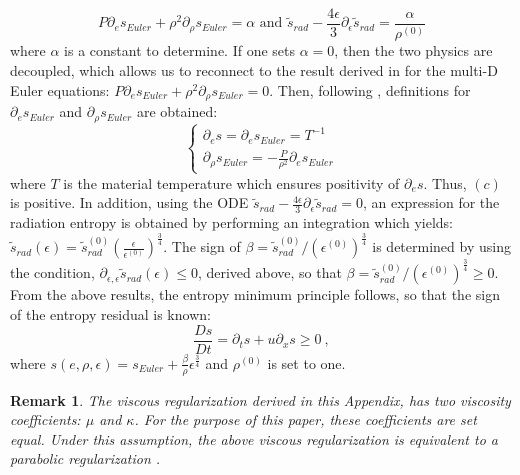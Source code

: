\documentclass[review]{elsarticle}
\newtheorem{remark}{Remark}[section]
\begin{document}
\begin{appendices}
 \begin{equation}
 P \partial_e s_{Euler} + \rho^2 \partial_{\rho} s_{Euler} = \alpha \text{ and } \tilde{s}_{rad} - \frac{4\epsilon}{3} \partial_{\epsilon} \tilde{s}_{rad} = \frac{\alpha}{\rho^{(0)}} \nonumber
 \end{equation}
 where $\alpha$ is a constant to determine. If one sets $\alpha=0$, then the two physics are decoupled, which allows us to reconnect to the result derived in \cite{jlg} for the multi-D Euler equations: $P \partial_e s_{Euler} + \rho^2 \partial_{\rho} s_{Euler} = 0$. Then, following \cite{jlg}, definitions for $\partial_e s_{Euler}$ and $\partial_{\rho} s_{Euler}$ are obtained:
 \begin{equation}
 \label{eq:definition}
 \left\{
 \begin{array}{ll}
 \partial_e s = \partial_e s_{Euler} = T^{-1} \nonumber\\
 \partial_{\rho} s_{Euler} = -\frac{P}{\rho^2} \partial_e s_{Euler}
 \end{array}
 \right.
 \end{equation} 
 where $T$ is the material temperature which ensures positivity of $\partial_e s$. Thus, $(c)$ is positive. In addition, using the ODE $\tilde{s}_{rad} - \frac{4\epsilon}{3} \partial_{\epsilon} \tilde{s}_{rad} = 0$, an expression for the radiation entropy is obtained by performing an integration which yields: $\tilde{s}_{rad}(\epsilon)  = \tilde{s}_{rad}^{(0)} \left(\frac{\epsilon}{\epsilon^{(0)}}\right)^\frac{3}{4}$. The sign of $\beta = \tilde{s}_{rad}^{(0)} / \left(\epsilon^{(0)}\right)^\frac{3}{4}$ is determined by using the condition, $\partial_{\epsilon,\epsilon} \tilde{s}_{rad}(\epsilon) \leq 0$, derived above, so that $\beta = \tilde{s}_{rad}^{(0)} / \left(\epsilon^{(0)}\right)^\frac{3}{4}\geq0$.\\
From the above results, the entropy minimum principle follows, so that the sign of the entropy residual is known:
\begin{equation}
\boxed{\frac{Ds}{Dt} = \partial_t s + u \partial_x s \geq 0} \ ,
\end{equation}
where $s\left( e, \rho, \epsilon \right) = s_{Euler} + \frac{\beta}{\rho} \epsilon^\frac{3}{4}$ and $\rho^{(0)}$ is set to one.
\begin{remark}
The viscous regularization derived in this Appendix, has two viscosity coefficients: $\mu$ and $\kappa$. For the purpose of this paper, these coefficients are set equal. Under this assumption, the above viscous regularization is equivalent to a parabolic regularization  \cite{Parabolic}.
\end{remark}


\end{appendices}
\end{document}

